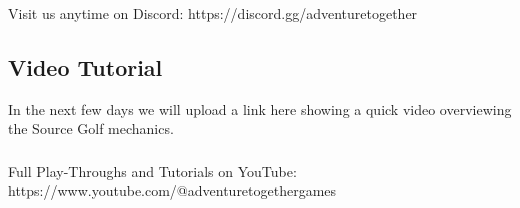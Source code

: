 \documentclass[../main.tex]{subfiles}
\begin{document}
\subsubsection{}
Visit us anytime on Discord: 
https://discord.gg/adventuretogether
\newpage
\subsection{Video Tutorial}
In the next few days we will upload a link here showing a quick video overviewing the Source Golf mechanics. 

\subsubsection{}
Full Play-Throughs and Tutorials on YouTube: 
https://www.youtube.com/@adventuretogethergames

\clearpage
\end{document}
